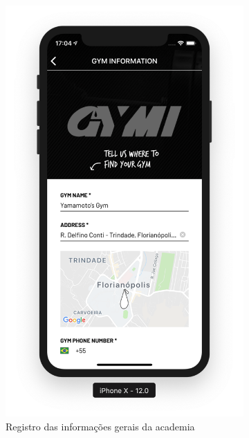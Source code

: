 \begin{figure}[H]
	\centering
    \begin{subfigure}[b]{0.3\textwidth}
        \includegraphics[width=\textwidth]{pfc/figuras/register-gym-info.png}
        \caption{Registro das informações gerais da academia}
        \label{fig:register-gym-info}
    \end{subfigure}
    ~
	\begin{subfigure}[b]{0.3\textwidth}

\end{subfigure}
\end{figure}
